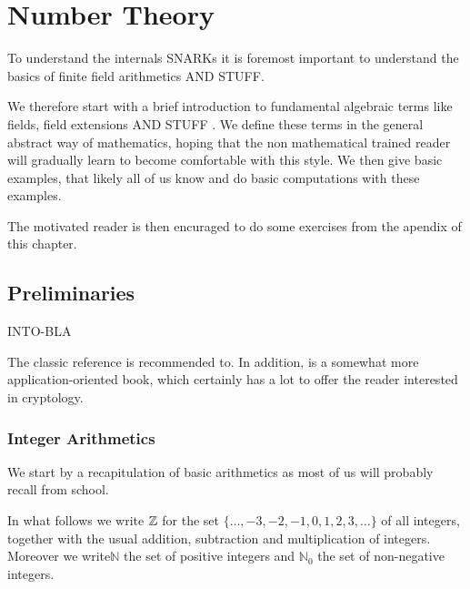 \chapter{Number Theory}

To understand the internals SNARKs it is foremost important to understand the basics of finite field arithmetics AND STUFF.

We therefore start with a brief introduction to fundamental algebraic terms like fields, field extensions AND STUFF . We define these terms in the general abstract way of mathematics, hoping that the non mathematical trained reader will gradually learn to become comfortable with this style. We then give basic examples, that likely all of us know and do basic computations with these examples. 

The motivated reader is then encuraged to do some exercises from  the apendix of this chapter.

\section{Preliminaries}
INTO-BLA


The classic reference \cite{HW} is recommended to. In addition, \cite{FO} is a somewhat more application-oriented book, which certainly has a lot to offer the reader interested in cryptology.

\subsection{Integer Arithmetics}
\label{integer_arithmetics}
We start by a recapitulation of basic arithmetics as most of us will probably recall from school.

In what follows we write $\mathbb{Z}$ for the set $\{\ldots, -3,-2,-1,0,1,2,3,\ldots\}$ of all integers, together with the usual addition, subtraction and multiplication of integers. Moreover we write$\mathbb{N}$ the set of positive integers and $\mathbb{N}_0$ the set of non-negative integers.

